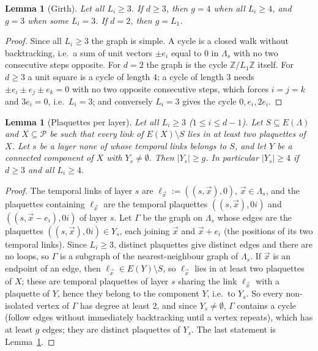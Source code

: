 \documentclass[11pt,a4paper]{article}
\newtheorem{lemma}[theorem]{Lemma}
\theoremstyle{definition}
\theoremstyle{remark}
\newcommand{\Z}{\mathbb{Z}}
\newcommand{\cP}{\mathcal{P}}
\begin{document}
\begin{lemma}[Girth]\label{mg:lem:girth}
Let all $L_i\ge3$. If $d\ge3$, then $g=4$ when all $L_i\ge4$, and $g=3$ when some $L_i=3$. If $d=2$, then $g=L_1$.
\end{lemma}

\begin{proof}
Since all $L_i\ge3$ the graph is simple. A cycle is a closed walk without backtracking, i.e.\ a sum of unit vectors $\pm e_i$ equal to
$0$ in $\Lambda_s$ with no two consecutive steps opposite. For $d=2$ the graph is the cycle $\Z/L_1\Z$ itself. For $d\ge3$ a unit square
is a cycle of length $4$; a cycle of length $3$ needs $\pm e_i\pm e_j\pm e_k=0$ with no two opposite consecutive steps, which forces
$i=j=k$ and $3e_i=0$, i.e.\ $L_i=3$; and conversely $L_i=3$ gives the cycle $0,e_i,2e_i$.
\end{proof}

\begin{lemma}[Plaquettes per layer]\label{mg:lem:layer}
Let all $L_i\ge3$ ($1\le i\le d-1$). Let $S\subseteq E(\Lambda)$ and $X\subseteq\cP$ be such that every link of $E(X)\setminus S$ lies in
at least two plaquettes of $X$. Let $s$ be a layer none of whose temporal links belongs to $S$, and let $Y$ be a connected component
of $X$ with $Y_s\neq\emptyset$. Then $|Y_s|\ge g$. In particular $|Y_s|\ge4$ if $d\ge3$ and all $L_i\ge4$.
\end{lemma}

\begin{proof}
The temporal links of layer $s$ are $\ell_{\vec x}:=((s,\vec x),0)$, $\vec x\in\Lambda_s$, and the plaquettes containing $\ell_{\vec x}$
are the temporal plaquettes $((s,\vec x),0i)$ and $((s,\vec x-e_i),0i)$ of layer $s$. Let $\Gamma$ be the graph on $\Lambda_s$ whose edges
are the plaquettes $((s,\vec x),0i)\in Y_s$, each joining $\vec x$ and $\vec x+e_i$ (the positions of its two temporal links). Since
$L_i\ge3$, distinct plaquettes give distinct edges and there are no loops, so $\Gamma$ is a subgraph of the nearest-neighbour graph of
$\Lambda_s$. If $\vec x$ is an endpoint of an edge, then $\ell_{\vec x}\in E(Y)\setminus S$, so $\ell_{\vec x}$ lies in at least two
plaquettes of $X$; these are temporal plaquettes of layer $s$ sharing the link $\ell_{\vec x}$ with a plaquette of $Y$, hence they belong
to the component $Y$, i.e.\ to $Y_s$. So every non-isolated vertex of $\Gamma$ has degree at least $2$, and since $Y_s\neq\emptyset$,
$\Gamma$ contains a cycle (follow edges without immediately backtracking until a vertex repeats), which has at least $g$ edges; they are
distinct plaquettes of $Y_s$. The last statement is Lemma~\ref{mg:lem:girth}.
\end{proof}
\end{document}
